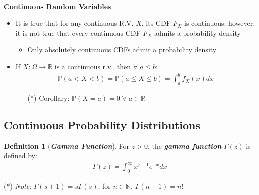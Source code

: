 \documentclass[12pt]{extarticle}
\newcommand{\pstart}[0]{\noindent}
\newcommand{\newp}[0]{~\\\pstart}
\newcommand{\term}[1]{\textbf{\textit{#1}}}
\newcommand{\titleul}[1]{\pstart\textbf{\ul{#1}}}
\theoremstyle{definition}
\newtheorem*{definition}{Definition}
\theoremstyle{remark}
\newcommand{\prob}[1]{\mathbb{P}\left(#1\right)}
\begin{document}
\newp
\titleul{Continuous Random Variables}
\begin{itemize}
    \item It is true that for any continuous R.V. $X$, its CDF $F_X$ is 
continuous; however, it is not true that every continuous CDF $F_X$ admits 
a probability density \begin{itemize}
        \item Only absolutely continuous CDFs admit a probability density
    \end{itemize}
    \item If $X:\Omega\to\mathbb{R}$ is a continuous r.v., then 
$\forall\;a\leq b$: \begin{align*}
        \prob{a<X<b}=\prob{a\leq X\leq b}=\int_a^bf_X(x)dx
    \end{align*} \begin{itemize}
        \item[($\ast$)] Corollary: $\prob{X=a}=0\;\forall\;a\in\mathbb{R}$
    \end{itemize}
\end{itemize}

\subsection{Continuous Probability Distributions}
\begin{tcolorbox}[colback=pink!25!white]
    \begin{definition}[\term{Gamma Function}]
        For $z>0$, the \term{gamma function} $\Gamma(z)$ is defined by: 
\begin{align*}
            \Gamma(z)=\int_0^\infty x^{z-1}e^{-x}dx
        \end{align*}
    \end{definition}

    ($\ast$) \textit{Note}: \ul{$\Gamma(s+1)=s\Gamma(s)$}; for 
$n\in\mathbb{N}$, $\Gamma(n+1)=n!$
\end{tcolorbox}
\end{document}
